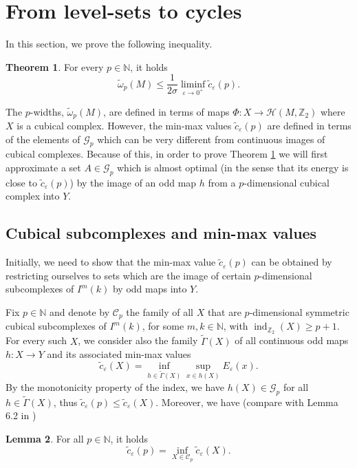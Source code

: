 \documentclass[12pt,english]{article}
\theoremstyle{definition}
\newtheorem{theorem}{Theorem}[section]
\newtheorem{lemma}[theorem]{Lemma}
\begin{document}
\section{From level-sets to cycles} \label{sec:phase-to-cycles}

In this section, we prove the following inequality.

\begin{theorem} \label{thm:wplp}
For every $p \in \mathbb{N}$, it holds
	\[\tilde\omega_p(M) \leq \frac{1}{2\sigma}\liminf_{\varepsilon \to 0^+} \tilde c_\varepsilon(p).\]
\end{theorem}

The $p$-widths, $\tilde \omega_p(M)$, are defined in terms of maps $\Phi: X \to \mathcal H(M,\mathbb{Z}_2)$ where $X$ is a cubical complex. However, the min-max values $\tilde c_\varepsilon(p)$ are defined in terms of the elements of $\mathcal{G}_p$ which can be very different from continuous images of cubical complexes. Because of this, in order to prove Theorem \ref{thm:wplp} we will first approximate a set $A \in \mathcal{G}_p$ which is almost optimal (in the sense that its energy is close to $\tilde c_\varepsilon(p)$) by the image of an odd map $h$ from a $p$-dimensional cubical complex into $Y$.

\subsection{Cubical subcomplexes and min-max values}

Initially, we need to show that the min-max value $\tilde c_\varepsilon(p)$ can be obtained by restricting ourselves to sets which are the image of certain $p$-dimensional subcomplexes of $I^m(k)$ by odd maps into $Y$.

Fix $p \in \mathbb{N}$ and denote by $\mathcal{C}_p$ the family of all $X$ that are $p$-dimensional symmetric cubical subcomplexes of $I^m(k)$, for some $m,k \in \mathbb{N}$, with $\operatorname{ind}_{\mathbb{Z}_2}(X)\geq p+1$. For every such $X$, we consider also the family $\tilde \Gamma(X)$ of all continuous odd maps $h:X \to Y$ and its associated min-max values
	\[\tilde c_\varepsilon(X) = \inf_{h \in \tilde \Gamma(X)} \sup_{x\in h(X)} E_\varepsilon(x).\]
By the monotonicity property of the index, we have $h(X) \in \mathcal{G}_p$ for all $h \in \tilde\Gamma(X)$, thus $\tilde c_\varepsilon(p)\leq \tilde c_\varepsilon(X)$. Moreover, we have (compare with Lemma 6.2 in \cite{GG2})

\begin{lemma} \label{lemma_pdim}
For all $p \in \mathbb{N}$, it holds
	\[\tilde c_\varepsilon(p) = \inf_{X \in \mathcal{C}_p} \tilde c_\varepsilon(X).\]
\end{lemma}
\end{document}
